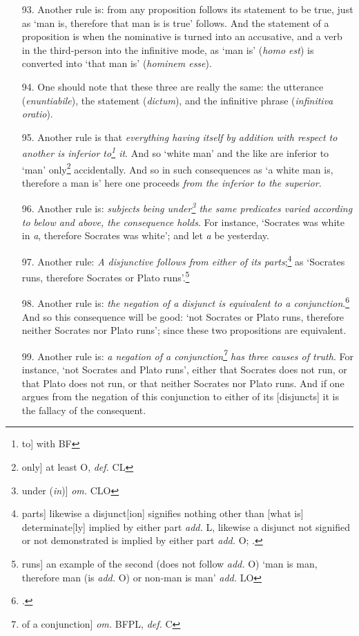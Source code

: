 \begin{itemize}
\item[93.] Another rule is: from any proposition follows its statement to be true, just as `man is, therefore that man is is true' follows. And the statement of a proposition is when the nominative is turned into an accusative, and a verb in the third-person into the infinitive mode, as `man is' (\textit{homo est}) is converted into `that man is' (\textit{hominem esse}).
\item[94.] One should note that these three are really the same: the utterance (\textit{enuntiabile}), the statement (\textit{dictum}), and the infinitive phrase (\textit{infinitiva oratio}).
\item[95.] Another rule is that \textit{everything having itself by addition with respect to another is inferior to\footnote{to] with BF} it}. And so `white man' and the like are inferior to `man' only\footnote{only] at least O, \textit{def.} CL} accidentally. And so in such consequences as `a white man is, therefore a man is' here one proceeds \textit{from the inferior to the superior}.
\item[96.] Another rule is: \textit{subjects being under\footnote{under (\textit{in})] \textit{om.} CLO} the same predicates varied according to below and above, the consequence holds}. For instance, `Socrates was white in \textit{a}, therefore Socrates was white'; and let \textit{a} be yesterday.
\item[97.] Another rule: \textit{A disjunctive follows from either of its parts};\footnote{parts] likewise a disjunct[ion] signifies nothing other than [what is] determinate[ly] implied by either part \textit{add.} L, likewise a disjunct not signified or not demonstrated is implied by either part \textit{add.} O; \cite[p. 116.12]{BurleyDPAL}.} as `Socrates runs, therefore Socrates or Plato runs'.\footnote{runs] an example of the second (does not follow \textit{add.} O) `man is man, therefore man (is \textit{add.} O) or non-man is man' \textit{add.} LO}
\item[98.] Another rule is: \textit{the negation of a disjunct is equivalent to a conjunction}.\footnote{\cite[p. 113.5]{BurleyDPAL}.} And so this consequence will be good: `not Socrates or Plato runs, therefore neither Socrates nor Plato runs'; since these two propositions are equivalent.
\item[99.] Another rule is: \textit{a negation of a conjunction\footnote{of a conjunction] \textit{om.} BFPL, \textit{def.} C} has three causes of truth}. For instance, `not Socrates and Plato runs', either that Socrates does not run, or that Plato does not run, or that neither Socrates nor Plato runs. And if one argues from the negation of this conjunction to either of its [disjuncts] it is the fallacy of the consequent.

\end{itemize}
